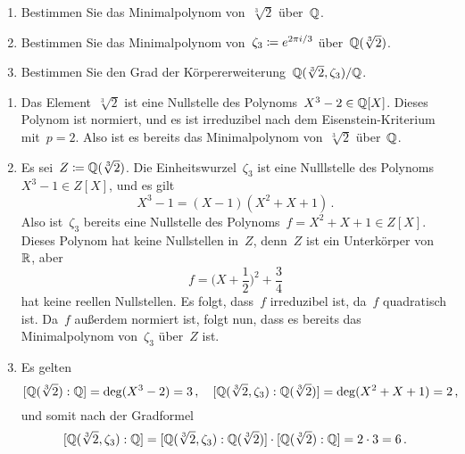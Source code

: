 \documentclass{scrartcl}
\begin{document}
\begin{exercise}
  \begin{enumerate}
    \item
      Bestimmen Sie das Minimalpolynom von~$\sqrt[3]{2}$ über~$\mathbb{Q}$.
    \item
      Bestimmen Sie das Minimalpolynom von~$\zeta_3 \coloneqq e^{2 \pi i / 3}$ über~$\mathbb{Q}(\sqrt[3]{2})$.
    \item
      Bestimmen Sie den Grad der Körpererweiterung~$\mathbb{Q}(\sqrt[3]{2}, \zeta_3) / \mathbb{Q}$.
  \end{enumerate}
\end{exercise}

\begin{solution}
  \begin{enumerate}
    \item
      Das Element~$\sqrt[3]{2}$ ist eine Nullstelle des Polynoms~$X^3 - 2 \in \mathbb{Q}[X]$.
      Dieses Polynom ist normiert, und es ist irreduzibel nach dem Eisenstein-Kriterium mit~$p = 2$.
      Also ist es bereits das Minimalpolynom von~$\sqrt[3]{2}$ über~$\mathbb{Q}$.
    \item
      Es sei~$Z \coloneqq \mathbb{Q}(\sqrt[3]{2})$.
      Die Einheitswurzel~$\zeta_3$ ist eine Nulllstelle des Polynoms~$X^3 - 1 \in Z[X]$, und es gilt
      \[
        X^3 - 1
        =
        (X - 1)(X^2 + X + 1) \,.
      \]
      Also ist~$\zeta_3$ bereits eine Nullstelle des Polynoms~$f = X^2 + X + 1 \in Z[X]$.
      Dieses Polynom hat keine Nullstellen in~$Z$, denn~$Z$ ist ein Unterkörper von~$\mathbb{R}$, aber
      \[
        f = \biggl( X + \frac{1}{2} \biggr)^2 + \frac{3}{4}
      \]
      hat keine reellen Nullstellen.
      Es folgt, dass~$f$ irreduzibel ist, da~$f$ quadratisch ist.
      Da~$f$ außerdem normiert ist, folgt nun, dass es bereits das Minimalpolynom von~$\zeta_3$ über~$Z$ ist.
    \item
      Es gelten
      \[
        [\mathbb{Q}(\sqrt[3]{2}) : \mathbb{Q}]
        =
        \deg(X^3 - 2)
        =
        3 \,,
        \quad
        [\mathbb{Q}(\sqrt[3]{2}, \zeta_3) : \mathbb{Q}(\sqrt[3]{2})]
        =
        \deg(X^2 + X + 1)
        =
        2 \,,
      \]
      und somit nach der Gradformel
      \[
        [\mathbb{Q}(\sqrt[3]{2}, \zeta_3) : \mathbb{Q}]
        =
        [\mathbb{Q}(\sqrt[3]{2}, \zeta_3) : \mathbb{Q}(\sqrt[3]{2})]
        \cdot
        [\mathbb{Q}( \sqrt[3]{2} ) : \mathbb{Q}]
        =
        2 \cdot 3
        =
        6 \,.
      \]
  \end{enumerate}
\end{solution}
\end{document}
